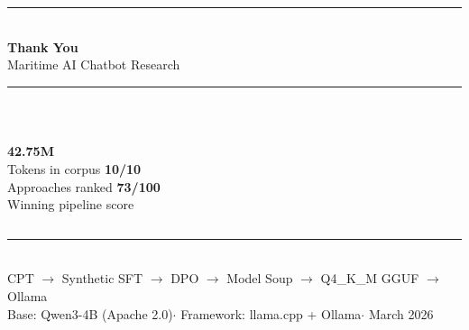 \documentclass[aspectratio=169,11pt]{beamer}
\begin{document}
{%
\begin{frame}[plain]
\vspace{0.6cm}
\begin{center}
  {\color{gold}\rule{0.52\textwidth}{1.5pt}}\\[8pt]
  {\color{white}\LARGE\bfseries Thank You}\\[5pt]
  {\color{white!80}\large Maritime AI Chatbot Research}\\[8pt]
  {\color{gold}\rule{0.52\textwidth}{0.8pt}}\\[10pt]
  \begin{columns}[c]
    \centering
      {\color{gold}\large\bfseries 42.75M}\\[2pt]
      {\color{white!70}\small Tokens in corpus}
    \centering
      {\color{gold}\large\bfseries 10/10}\\[2pt]
      {\color{white!70}\small Approaches ranked}
    \centering
      {\color{gold}\large\bfseries 73/100}\\[2pt]
      {\color{white!70}\small Winning pipeline score}
  \end{columns}
  \vspace{8pt}
  {\color{gold}\rule{0.52\textwidth}{0.8pt}}\\[6pt]
  {\color{white!70}\small
    CPT $\to$ Synthetic SFT $\to$ DPO $\to$
    Model Soup $\to$ Q4\_K\_M GGUF $\to$ Ollama}\\[3pt]
  {\color{white!50}\footnotesize
    Base: Qwen3-4B (Apache 2.0)\enspace$\cdot$\enspace
    Framework: llama.cpp + Ollama\enspace$\cdot$\enspace
    March 2026}
\end{center}
\end{frame}
}

\appendix
\end{document}
